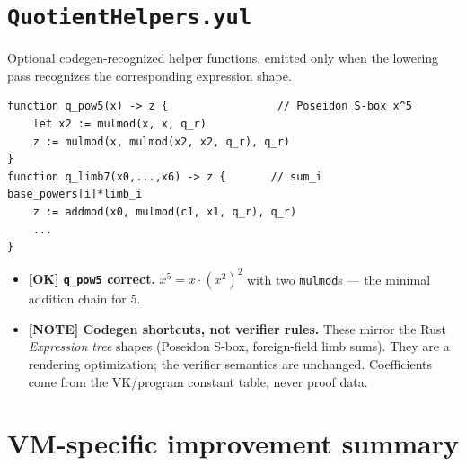 \section{\texttt{QuotientHelpers.yul}}
\label{sec:qhelpers-audit}

Optional codegen-recognized helper functions, emitted only when the
lowering pass recognizes the corresponding expression shape.

\begin{lstlisting}[style=yul]
function q_pow5(x) -> z {                 // Poseidon S-box x^5
    let x2 := mulmod(x, x, q_r)
    z := mulmod(x, mulmod(x2, x2, q_r), q_r)
}
function q_limb7(x0,...,x6) -> z {       // sum_i base_powers[i]*limb_i
    z := addmod(x0, mulmod(c1, x1, q_r), q_r)
    ...
}
\end{lstlisting}
\begin{itemize}
  \item \textcolor{tracegreen}{\textbf{[OK] \texttt{q\_pow5} correct.}}
        $x^5 = x\cdot(x^2)^2$ with two \texttt{mulmod}s --- the
        minimal addition chain for 5.
  \item \textcolor{mathpurple}{\textbf{[NOTE] Codegen shortcuts, not
        verifier rules.}} These mirror the Rust \emph{Expression tree}
        shapes (Poseidon S-box, foreign-field limb sums). They are a
        rendering optimization; the verifier semantics are unchanged.
        Coefficients come from the VK/program constant table, never
        proof data.
\end{itemize}

\section{VM-specific improvement summary}
\label{sec:vm-improvements}

